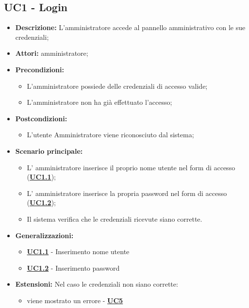 \documentclass[5pt]{article}
\begin{document}
\subsection{UC1 - Login}
\label{sec:UC1}
\begin{itemize}
	\item \textbf{Descrizione:} L’amministratore accede al pannello amministrativo con le sue credenziali;
	\item \textbf{Attori:} amministratore;
	\item \textbf{Precondizioni:} 
	\begin{itemize}
		\item L’amministratore possiede delle credenziali di accesso valide;
		\item L’amministratore non ha già effettuato l’accesso;
	\end{itemize}
	\item \textbf{Postcondizioni:} 
	\begin{itemize}
		\item L’utente Amministratore viene riconosciuto dal sistema;
	\end{itemize}
	\item \textbf{Scenario principale:} 
	\begin{itemize}
		\item L’ amministratore inserisce il proprio nome utente nel form di accesso (\hyperref[sec:UC1.1]{\textbf{UC1.1}});
		\item L’ amministratore inserisce la propria password nel form di accesso (\hyperref[sec:UC1.2]{\textbf{UC1.2}});
		\item Il sistema verifica che le credenziali ricevute siano corrette. 
	\end{itemize}
	\item \textbf{Generalizzazioni:} 
	\begin{itemize}
		\item \hyperref[sec:UC1.1]{\textbf{UC1.1}} - Inserimento nome utente
		\item \hyperref[sec:UC1.2]{\textbf{UC1.2}} - Inserimento password
	\end{itemize}
	\item \textbf{Estensioni:} Nel caso le credenziali non siano corrette:
	\begin{itemize}
		\item viene mostrato un errore - \hyperref[sec:UC5]{\textbf{UC5}}
	\end{itemize}
\end{itemize}
\end{document}
